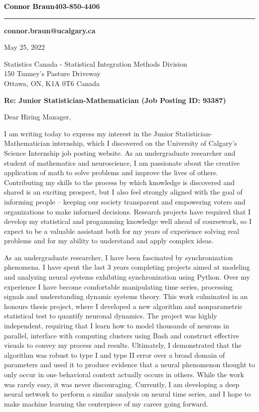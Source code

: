 \documentclass[12pt]{resume}
\begin{document}
\noindent
\begin{minipage}{\textwidth}
    \begin{flushleft}
        \LARGE\bf
        \textcolor{black}{Connor Braun}\hfill\normalsize{\bf403-850-4406}\\[5pt]
        \hrule
        \vspace{4pt}
        \hfill{\bf connor.braun@ucalgary.ca}
    \end{flushleft}
\end{minipage}
    
May 25, 2022

Statistics Canada - Statistical Integration Methods Division\\
150 Tunney's Pasture Driveway\\
Ottawa, ON, K1A 0T6 Canada

{\bf Re: Junior Statistician-Mathematician (Job Posting ID: 93387)}

Dear Hiring Manager,

I am writing today to express my interest in the Junior Statistician-Mathematician internship, which I 
discovered on the University of Calgary's Science Internship job posting website. As an
undergraduate researcher and student of mathematics and neuroscience, I am passionate about the creative 
application of math to solve problems and improve the lives of others. Contributing my skills
to the process  by which knowledge is discovered and shared is an exciting prospect, 
but I also feel strongly aligned with the goal of informing people -- keeping our society transparent and 
empowering voters and organizations to make informed decisions. Research projects have required that 
I develop my statistical and progamming knowledge well ahead of coursework, so I expect to be a valuable
assistant both for my years of experience solving real problems and for my ability to understand and apply
complex ideas. 
 
As an undergraduate researcher, I have been fascinated by synchronization phenomena.
I have spent the last 3 years completing projects aimed at modeling and analyzing neural systems exhibiting synchronization using 
Python. Over my experience I have become comfortable manipulating time series, processing signals and understanding dynamic systems theory. 
This work culminated in an honours thesis project, where I developed a new algorithm and nonparametric 
statistical test to quantify neuronal dynamics. The project was highly independent, requiring that I learn 
how to model thousands of neurons in parallel, interface with computing clusters using Bash and construct effective 
visuals to convey my process and results. Ultimately, I demonstrated that the algorithm was robust to type I and type II 
error over a broad domain of parameters and used it to produce evidence that a neural phenomenon thought to only occur in
one behavioral context actually occurs in others. While the work was rarely easy, it was never discouraging. Currently, I am developing a
deep neural network to perform a similar analysis on neural time series, and I hope to make machine learning the centerpiece of 
my career going forward.
\end{document}
